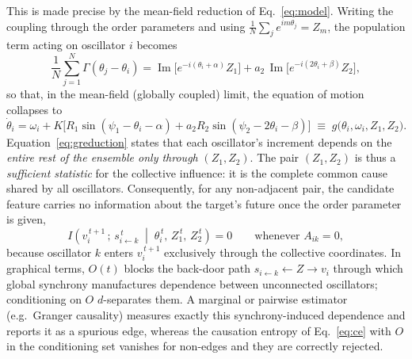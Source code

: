 This is made precise by the mean-field reduction of Eq.~\eqref{eq:model}. Writing
the coupling through the order parameters and using
$\tfrac1N\sum_j e^{im\theta_j}=Z_m$, the population term acting on oscillator $i$
becomes
\begin{equation}
\frac{1}{N}\sum_{j=1}^{N}\Gamma(\theta_j-\theta_i)
=\operatorname{Im}\!\big[e^{-i(\theta_i+\alpha)}Z_1\big]
+a_2\,\operatorname{Im}\!\big[e^{-i(2\theta_i+\beta)}Z_2\big],
\label{eq:meanfield}
\end{equation}
so that, in the mean-field (globally coupled) limit, the equation of motion
collapses to
\begin{equation}
\dot\theta_i=\omega_i+K\Big[R_1\sin(\psi_1-\theta_i-\alpha)
+a_2R_2\sin(\psi_2-2\theta_i-\beta)\Big]
\;\equiv\; g\!\big(\theta_i,\omega_i,Z_1,Z_2\big).
\label{eq:greduction}
\end{equation}
Equation~\eqref{eq:greduction} states that each oscillator's increment depends on
the \emph{entire rest of the ensemble only through} $(Z_1,Z_2)$. The pair
$(Z_1,Z_2)$ is thus a \emph{sufficient statistic} for the collective influence:
it is the complete common cause shared by all oscillators. Consequently, for any
non-adjacent pair, the candidate feature carries no information about the
target's future once the order parameter is given,
\begin{equation}
I\!\left(v_i^{\,t+1}\,;\,s_{i\leftarrow k}^{\,t}\;\middle|\;\theta_i^{\,t},\,Z_1^{\,t},\,Z_2^{\,t}\right)=0
\qquad\text{whenever } A_{ik}=0,
\label{eq:dsep}
\end{equation}
because oscillator $k$ enters $v_i^{\,t+1}$ exclusively through the collective
coordinates. In graphical terms, $O(t)$ blocks the back-door path
$s_{i\leftarrow k}\!\leftarrow\! Z \!\rightarrow\! v_i$ through which global
synchrony manufactures dependence between unconnected oscillators; conditioning
on $O$ $d$-separates them. A marginal or pairwise estimator (e.g.\ Granger
causality) measures exactly this synchrony-induced dependence and reports it as a
spurious edge, whereas the causation entropy of Eq.~\eqref{eq:ce} with $O$ in the
conditioning set vanishes for non-edges and they are correctly rejected.

